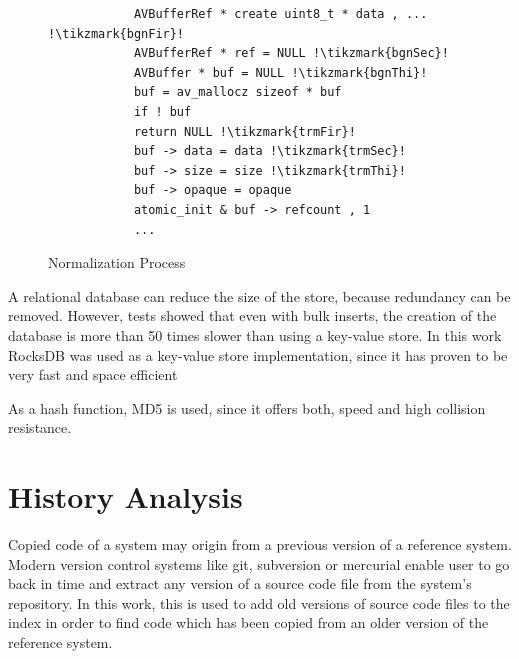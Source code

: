 \begin{figure}[h]
	\centering
	\begin{minipage}{1.2\linewidth}
		\begin{minipage}{0.35\linewidth}
			\scriptsize
			
		\end{minipage}
		\begin{minipage}{0.23\linewidth}
			\scriptsize
			\begin{lstlisting}
			AVBufferRef * create uint8_t * data , ... !\tikzmark{bgnFir}!
			AVBufferRef * ref = NULL !\tikzmark{bgnSec}!
			AVBuffer * buf = NULL !\tikzmark{bgnThi}!
			buf = av_mallocz sizeof * buf
			if ! buf
			return NULL !\tikzmark{trmFir}!
			buf -> data = data !\tikzmark{trmSec}!
			buf -> size = size !\tikzmark{trmThi}!
			buf -> opaque = opaque
			atomic_init & buf -> refcount , 1
			...
			\end{lstlisting}
			
			
		\end{minipage}
	\end{minipage}
	\caption{Normalization Process}\label{fig:normalization}
\end{figure}


A relational database can reduce the size of the store, because redundancy can be removed.
However, tests showed that even with bulk inserts, the creation of the database is more than 50 times slower than using a key-value store.
In this work RocksDB was used as a key-value store implementation, since it has proven to be very fast and space efficient

As a hash function, MD5 is used, since it offers both, speed and high collision resistance.

\section{History Analysis}\label{section:implementation/history_analysis}
Copied code of a system may origin from a previous version of a reference system.
Modern version control systems like git, subversion or mercurial enable user to go back in time and extract any version of a source code file from the system's repository.
In this work, this is used to add old versions of source code files to the index in order to find code which has been copied from an older version of the reference system.

